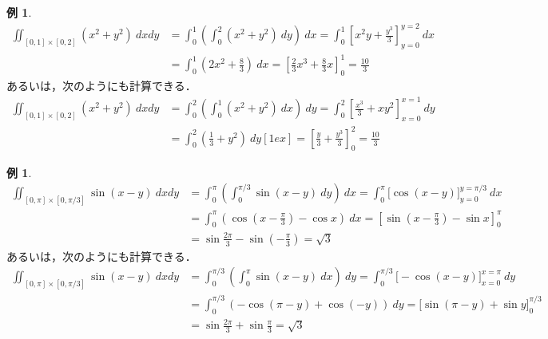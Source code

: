 \documentclass[10pt, uplatex, dvipdfmx]{jsarticle}
\theoremstyle{definition}
\newtheorem{example}[theorem]{例}
\numberwithin{equation}{section}
\begin{document}
\begin{example}
  \[
    \begin{aligned}
      \iint_{[0,1] \times [0,2]} \left( x^2+y^2\right) \ dx dy
      &= \int_{0}^{1} \left( \int_{0}^{2} (x^2+y^2) \ dy \right) \ dx
        = \int_{0}^{1} \left[ x^2y + \frac{y^3}{3} \right]_{y=0}^{y=2} \ dx\\[1ex]
      & = \int_{0}^{1} \left( 2x^2 + \frac{8}{3}\right) \ dx = \left[\frac{2}{3}x^3 + \frac{8}{3}x \right]_{0}^{1}
        =\frac{10}{3}
    \end{aligned}
  \]
  あるいは，次のようにも計算できる．
  \[
    \begin{aligned}
        \iint_{[0,1] \times [0,2]} \left( x^2+y^2\right) \ dx dy
      &= \int_{0}^{2} \left( \int_{0}^{1} (x^2+y^2) \ dx \right) \ dy
        = \int_{0}^{2} \left[ \frac{x^3}{3} + xy^2 \right]_{x=0}^{x=1} \ dy\\
      & = \int_{0}^{2} \left( \frac{1}{3} + y^2\right) \ dy[1ex]
        = \left[ \frac{y}{3} + \frac{y^3}{3}\right]_{0}^{2}=\frac{10}{3}
    \end{aligned}
  \]
\end{example}

\vspace{1zh}

\begin{example}
  \[
    \begin{aligned}
      \iint_{[0,\pi]\times [0, \pi/3]} \sin(x-y) \ dx dy
      &= \int_{0}^{\pi} \left( \int_{0}^{\pi/3} \sin (x-y) \ dy \right) \ dx
        = \int_{0}^{\pi} \Big[ \cos(x-y) \Big]_{y=0}^{y=\pi/3} \ dx \\[1ex]
      &= \int_{0}^{\pi} \left( \cos\left( x - \frac{\pi}{3}\right) - \cos x\right) \ dx
        = \left[ \sin\left( x - \frac{\pi}{3}\right) - \sin x\right]_{0}^{\pi}\\[1ex]
      &= \sin \frac{2\pi}{3} - \sin\left( -\frac{\pi}{3}\right) =  \sqrt{3}
    \end{aligned}
  \]
  あるいは，次のようにも計算できる．
  \[
    \begin{aligned}
      \iint_{[0,\pi] \times [0, \pi/3]} \sin(x-y) \ dx dy
      &= \int_{0}^{\pi/3} \left( \int_{0}^{\pi} \sin(x-y) \ dx \right) \ dy
        = \int_{0}^{\pi/3} \Big[ -\cos(x-y) \Big]_{x=0}^{x=\pi} \ dy\\
      &= \int_{0}^{\pi/3}\left( -\cos\left(\pi-y\right) + \cos\left(-y\right) \right) \ dy
        =\Big[ \sin(\pi-y) + \sin y\Big]_{0}^{\pi/3}\\[1ex]
      &= \sin\frac{2\pi}{3} + \sin\frac{\pi}{3} = \sqrt{3}
    \end{aligned}
  \]
\end{example}
\end{document}
